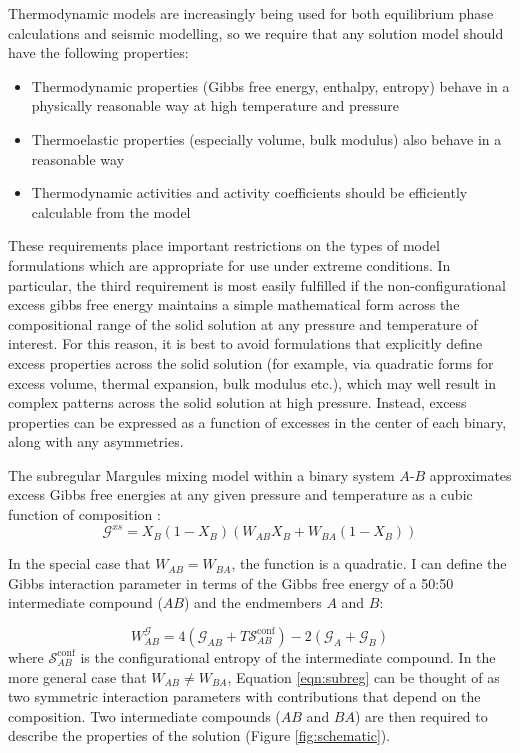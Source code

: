 Thermodynamic models are increasingly being used for both equilibrium phase calculations and seismic modelling, so we require that any solution model should have the following properties:
\begin{itemize}
\item Thermodynamic properties (Gibbs free energy, enthalpy, entropy) behave in a physically reasonable way at high temperature and pressure 
\item Thermoelastic properties (especially volume, bulk modulus) also behave in a reasonable way
\item Thermodynamic activities and activity coefficients should be efficiently calculable from the model
\end{itemize}

These requirements place important restrictions on the types of model formulations which are appropriate for use under extreme conditions. In particular, the third requirement is most easily fulfilled if the non-configurational excess gibbs free energy maintains a simple mathematical form across the compositional range of the solid solution at any pressure and temperature of interest. For this reason, it is best to avoid formulations that explicitly define excess properties across the solid solution (for example, via quadratic forms for excess volume, thermal expansion, bulk modulus etc.), which may well result in complex patterns across the solid solution at high pressure. Instead, excess properties can be expressed as a function of excesses in the center of each binary, along with any asymmetries.


The subregular Margules mixing model within a binary system $A$-$B$ approximates excess Gibbs free energies at any given pressure and temperature as a cubic function of composition \citep{HW1989}:
\begin{equation}
  \mathcal{G}^{xs} = X_B (1-X_B) \left(W_{AB} X_B + W_{BA} (1-X_B) \right)
  \label{eqn:subreg}
\end{equation}

In the special case that $W_{AB} = W_{BA}$, the function is a quadratic. I can define the Gibbs interaction parameter in terms of the Gibbs free energy of a 50:50 intermediate compound ($AB$) and the endmembers $A$ and $B$:

\begin{equation}
  W^{\mathcal{G}}_{AB} = 4(\mathcal{G}_{AB} + T\mathcal{S}^{\textrm{conf}}_{AB}) - 2(\mathcal{G}_A + \mathcal{G}_B)
\end{equation}
\noindent where $\mathcal{S}^{\textrm{conf}}_{AB}$ is the configurational entropy of the intermediate compound. In the more general case that $W_{AB} \neq W_{BA}$, Equation \ref{eqn:subreg} can be thought of as two symmetric interaction parameters with contributions that depend on the composition. Two intermediate compounds ($AB$ and $BA$) are then required to describe the properties of the solution (Figure \ref{fig:schematic}).

